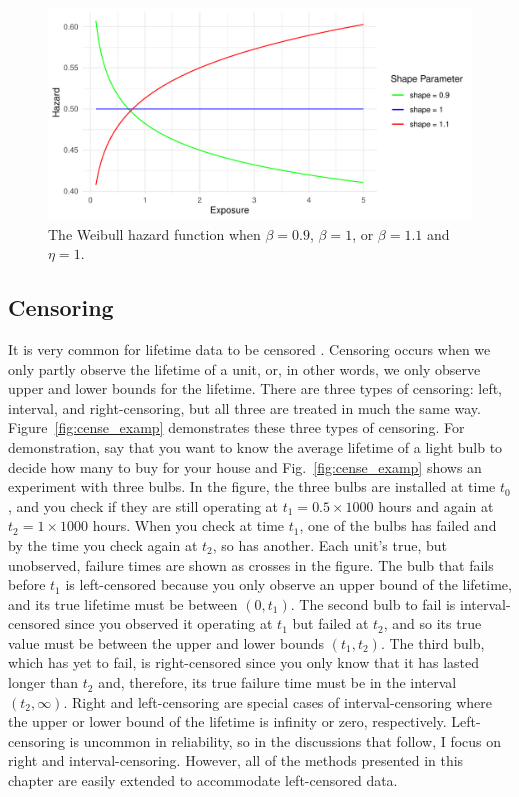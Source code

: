 \begin{figure}[t]
    \centering
    \includegraphics[width=1\textwidth]{./figures/ch-2/hazard_func_demo.pdf}
    \caption{The Weibull hazard function when $\beta = 0.9$, $\beta = 1$, or $\beta = 1.1$ and $\eta = 1$.}
    \label{fig:hazard_function_demo}
\end{figure}

\subsection{Censoring} \label{subsec:censoring-treatments}

It is very common for lifetime data to be censored \citep{tian2024}. Censoring occurs when we only partly observe the lifetime of a unit, or, in other words, we only observe upper and lower bounds for the lifetime. There are three types of censoring: left, interval, and right-censoring, but all three are treated in much the same way. Figure~\ref{fig:cense_examp} demonstrates these three types of censoring. For demonstration, say that you want to know the average lifetime of a light bulb to decide how many to buy for your house and Fig.~\ref{fig:cense_examp} shows an experiment with three bulbs. In the figure, the three bulbs are installed at time $t_0$, and you check if they are still operating at $t_1 = 0.5 \times 1000$ hours and again at $t_2 = 1 \times 1000$ hours. When you check at time $t_1$, one of the bulbs has failed and by the time you check again at $t_2$, so has another. Each unit's true, but unobserved, failure times are shown as crosses in the figure. The bulb that fails before $t_1$ is left-censored because you only observe an upper bound of the lifetime, and its true lifetime must be between $(0, t_1)$. The second bulb to fail is interval-censored since you observed it operating at $t_1$ but failed at $t_2$, and so its true value must be between the upper and lower bounds $(t_1, t_2)$. The third bulb, which has yet to fail, is right-censored since you only know that it has lasted longer than $t_2$ and, therefore, its true failure time must be in the interval $(t_2, \infty)$. Right and left-censoring are special cases of interval-censoring where the upper or lower bound of the lifetime is infinity or zero, respectively. Left-censoring is uncommon in reliability, so in the discussions that follow, I focus on right and interval-censoring. However, all of the methods presented in this chapter are easily extended to accommodate left-censored data.

